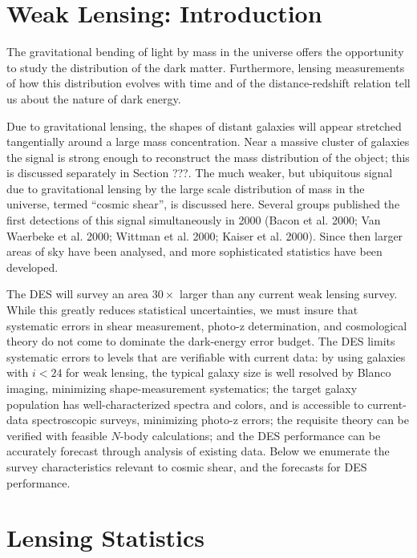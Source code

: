 \documentclass[preprint]{aastex}
\begin{document}

\section{Weak Lensing: Introduction}

The gravitational bending of light by mass in the universe offers
the opportunity to study the distribution of the dark matter.
Furthermore, lensing measurements of how this distribution
evolves with time and of the distance-redshift relation
tell us about the nature of dark energy.

Due to gravitational lensing, the shapes of distant galaxies will
appear stretched tangentially around a large mass concentration.
Near a massive cluster of galaxies the signal is strong enough to
reconstruct the mass distribution of the object; this is discussed
separately in Section ???. The much weaker, but ubiquitous
signal due to gravitational lensing by the large scale distribution
of mass in the universe, termed ``cosmic shear'', is discussed here.
Several groups published the first detections of this signal
simultaneously in 2000 (Bacon et al. 2000; Van Waerbeke et al. 2000;
Wittman et al. 2000; Kaiser et al. 2000). Since then larger areas of
sky have been analysed, and more sophisticated statistics have been
developed.

The DES will survey an area $30\times$ larger than any current weak
lensing survey.  While this greatly reduces statistical uncertainties,
we must insure that systematic errors in shear measurement, photo-z
determination, and cosmological theory do not come to dominate the
dark-energy error budget.  The DES limits systematic errors to levels
that are verifiable with current data: by using galaxies with $i<24$ for
weak lensing, the typical galaxy size is well resolved by Blanco
imaging, minimizing shape-measurement systematics; the target galaxy
population has well-characterized spectra and colors, and is
accessible to current-data spectroscopic surveys, minimizing photo-z
errors; the requisite theory can be verified with feasible $N$-body
calculations; and the DES performance can be accurately forecast through
analysis of existing data.  Below we enumerate the survey
characteristics relevant to cosmic shear, and the forecasts for DES
performance.

\section{Lensing Statistics}
\end{document}
